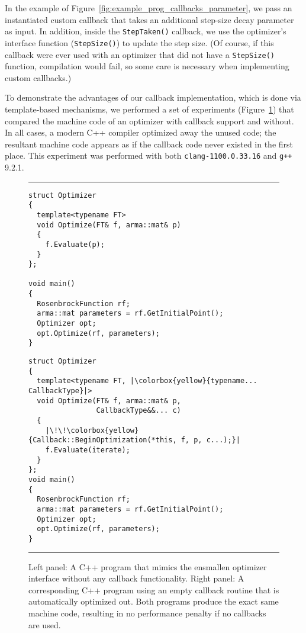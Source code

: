 In the example of Figure~\ref{fig:example_prog_callbacks_parameter}, we pass an
instantiated custom callback that takes an additional step-size decay parameter
as input.  In addition, inside the {\tt StepTaken()} callback, we use the
optimizer's interface function ({\tt StepSize()}) to update the step size.  (Of
course, if this callback were ever used with an optimizer that did not have a
{\tt StepSize()} function, compilation would fail, so some care is necessary
when implementing custom callbacks.)

To demonstrate the advantages of our callback implementation, which is done via
template-based mechanisms, we performed a set of
experiments (Figure~\ref{fig:callback_compilter_opt}) that compared the machine
code of an optimizer with callback support and without. In all cases, a modern
C++ compiler optimized away the unused code; the resultant machine code appears
as if the callback code never existed in the first place.  This experiment was
performed with both {\tt clang-1100.0.33.16} and {\tt g++} 9.2.1.

\begin{figure}[t!]
\centering
\hrule
\vspace{1ex}
\begin{minipage}{0.47\textwidth}
\begin{verbatim}
struct Optimizer
{
  template<typename FT>
  void Optimize(FT& f, arma::mat& p)
  {
    f.Evaluate(p);
  }
};

void main()
{
  RosenbrockFunction rf;
  arma::mat parameters = rf.GetInitialPoint();
  Optimizer opt;
  opt.Optimize(rf, parameters);
}

\end{verbatim}
\end{minipage}
%
\hfill
\vline
\hfill
%
\begin{minipage}{0.51\textwidth}
\begin{verbatim}
struct Optimizer
{
  template<typename FT, |\colorbox{yellow}{typename... CallbackType}|>
  void Optimize(FT& f, arma::mat& p,
                CallbackType&&... c)
  {
    |\!\!\colorbox{yellow}{Callback::BeginOptimization(*this, f, p, c...);}|
    f.Evaluate(iterate);
  }
};
void main()
{
  RosenbrockFunction rf;
  arma::mat parameters = rf.GetInitialPoint();
  Optimizer opt;
  opt.Optimize(rf, parameters);
}
\end{verbatim}
\end{minipage}
\vspace{1ex}
\hrule
\caption
  {
  Left panel: A C++ program that mimics the ensmallen optimizer interface
  without any callback functionality. Right panel: A corresponding C++ program
  using an empty callback routine that is automatically optimized out. Both
  programs produce the exact same machine code, resulting in no performance
  penalty if no callbacks are used.
  }
\label{fig:callback_compilter_opt}
\end{figure}


